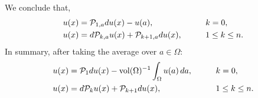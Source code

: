 \documentclass[10pt,a4paper]{article}
\begin{document}
\endgroup
We conclude that, 
\begin{alignat*}{4}
    u(x) &= {\mathcal P}_{1,a} d u(x) - u(a), \qquad                              && k = 0,
    \\
    u(x) &= d {\mathcal P}_{k,a} u(x) + {\mathcal P}_{k+1,a} d u(x), \qquad && 1 \leq k \leq n.
\end{alignat*}
In summary, after taking the average over $a \in \Omega$:
\begin{alignat}{4}\label{math:hodgedecomposition:poinc}
    u(x) &= {\mathcal P}_{1} d u(x) - \operatorname{vol}(\Omega)^{-1} \int_\Omega u(a) \,da,  \qquad && k = 0,
    \\
    u(x) &= d {\mathcal P}_{k} u(x) + {\mathcal P}_{k+1} d u(x),          \qquad && 1 \leq k \leq n.
\end{alignat}
\end{document}
